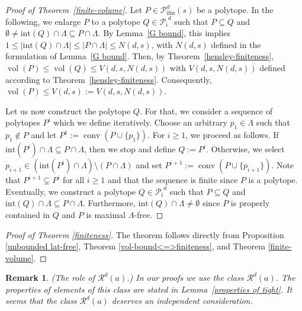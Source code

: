 \documentclass[a4paper]{article}
\theoremstyle{plain}
\newtheorem{remark}[nn]{Remark}
\begin{document}
\begin{proof}[Proof of Theorem~\ref{finite-volume}]
Let $P \in {{\mathcal{P}}_{{\mathop{\mathrm{{ifm}}}}}^{{d}}({s})}$ be a polytope.
In the following, we enlarge $P$ to a polytope $Q \in
{{\mathcal{P}}_{{\mathop{\mathrm{{i}}}}}}^d$ such that $P \subseteq Q$ and $\emptyset \neq
{\mathrm{int}}(Q) \cap \Lambda \subseteq P \cap \Lambda$.
By Lemma~\ref{G bound}, this implies $1 \le |{\mathrm{int}}(Q) \cap
\Lambda| \le |P \cap \Lambda| \leq N(d,s)$, with $N(d,s)$
defined in the formulation of Lemma~\ref{G bound}.
Then, by Theorem~\ref{hensley-finiteness}, ${{\mathop{\mathrm{{vol}}}}}(P) \le
{{\mathop{\mathrm{{vol}}}}}(Q) \le V(d,s,N(d,s))$ with $V(d,s,N(d,s))$ defined
according to Theorem~\ref{hensley-finiteness}.
Consequently, ${{\mathop{\mathrm{{vol}}}}}(P) \le V(d,s) := V(d,s,N(d,s))$.

Let us now construct the polytope $Q$.
For that, we consider a sequence of polytopes $P^i$ which we
define iteratively.
Choose an arbitrary $p_1 \in \Lambda$ such that $p_1 \not
\in P$ and let $P^1 := {{\mathop{\mathrm{{conv}}}}} (P \cup \{p_1\})$.
For $i \ge 1$, we proceed as follows.
If ${\mathrm{int}}(P^i) \cap \Lambda \subseteq P \cap \Lambda$, then
we stop and define $Q := P^i$.
Otherwise, we select $p_{i+1} \in ({\mathrm{int}}(P^i) \cap \Lambda)
\setminus (P \cap \Lambda)$ and set $P^{i+1} := {{\mathop{\mathrm{{conv}}}}}(P \cup
\{p_{i+1}\})$.
Note that $P^{i+1} \varsubsetneq P^i$ for all $i \ge 1$ and
that the sequence is finite since $P$ is a polytope.
Eventually, we construct a polytope $Q \in {{\mathcal{P}}_{{\mathop{\mathrm{{i}}}}}}^d$ such that
$P \subseteq Q$ and ${\mathrm{int}}(Q) \cap \Lambda \subseteq P \cap
\Lambda$.
Furthermore, ${\mathrm{int}}(Q) \cap \Lambda \neq \emptyset$ since
$P$ is properly contained in $Q$ and $P$ is maximal
$\Lambda$-free.
\end{proof}

\begin{proof}[Proof of Theorem \ref{finiteness}]
The theorem follows directly from
Proposition \ref{unbounded lat-free},
Theorem \ref{vol-bound<=>finiteness}, and
Theorem \ref{finite-volume}.
\end{proof}

\begin{remark} \label{study reduced} {\emph{({The role of
    ${\mathcal{R}}^d(a)$}.)}}
In our proofs we use the class ${\mathcal{R}}^d(a)$.
The properties of elements of this class are stated in
Lemma~\ref{properties of tight}.
It seems that the class ${\mathcal{R}}^d(a)$ deserves an independent
consideration.
\end{remark}
\end{document}
